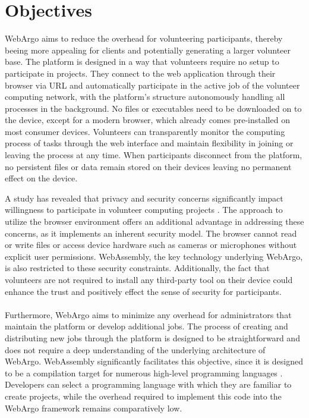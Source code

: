 \section{Objectives}
\label{sec:intro:objectives}
WebArgo aims to reduce the overhead for volunteering participants, thereby beeing more appealing for clients and potentially generating a larger volunteer base. The platform is designed in a way that volunteers require no setup to participate in projects. They connect to the web application through their browser via \acs{URL} and automatically participate in the active job of the volunteer computing network, with the platform's structure autonomously handling all processes in the background. No files or executables need to be downloaded on to the device, except for a modern browser, which already comes pre-installed on most consumer devices. Volunteers can transparently monitor the computing process of tasks through the web interface and maintain flexibility in joining or leaving the process at any time. When participants disconnect from the platform, no persistent files or data remain stored on their devices leaving no permanent effect on the device.

A study has revealed that privacy and security concerns significantly impact willingness to participate in volunteer computing projects \cite{intro:volunteerStudy}. The approach to utilize the browser environment offers an additional advantage in addressing these concerns, as it implements an inherent security model. The browser cannot read or write files or access device hardware such as cameras or microphones without explicit user permissions. WebAssembly, the key technology underlying WebArgo, is also restricted to these security constraints. Additionally, the fact that volunteers are not required to install any third-party tool on their device could enhance the trust and positively effect the sense of security for participants.
\\~\\
Furthermore, WebArgo aims to minimize any overhead for administrators that maintain the platform or develop additional jobs. The process of creating and distributing new jobs through the platform is designed to be straightforward and does not require a deep understanding of the underlying architecture of WebArgo. WebAssembly significantly facilitates this objective, since it is designed to be a compilation target for numerous high-level programming languages \cite{methodology:wasm, methodology:wasmW3C, methodology:wasmdocu, relatedwork:wasmedgecomputing}. Developers can select a programming language with which they are familiar to create projects, while the overhead required to implement this code into the WebArgo framework remains comparatively low. 

